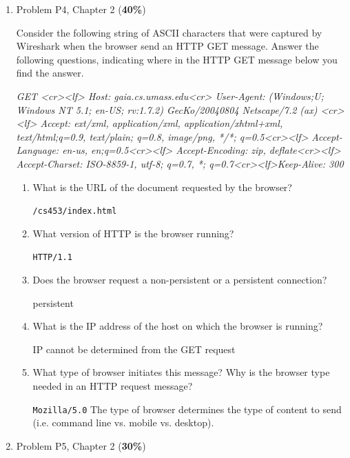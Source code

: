 \documentclass{article}
\begin{document}
\begin{enumerate}
\item Problem P4, Chapter 2 (\textbf{40\%})\par
Consider the following string of ASCII characters that were captured by Wireshark when the browser send an HTTP GET message. Answer the following questions, indicating where in the HTTP GET message below you find the answer.\par
{\textit{GET  <cr><lf> Host: gaia.cs.umass.edu<cr> User-Agent:  (Windows;U; Windows NT 5.1; en-US; rv:1.7.2) GecKo/20040804 Netscape/7.2 (ax) <cr><lf> Accept: ext/xml, application/xml, application/xhtml+xml, text/html;q=0.9, text/plain; q=0.8, image/png, */*; q=0.5<cr><lf> Accept-Language: en-us, en;q=0.5<cr><lf> Accept-Encoding: zip, deflate<cr><lf> Accept-Charset: ISO-8859-1, utf-8; q=0.7, *; q=0.7<cr><lf>Keep-Alive: 300 }}\par
\begin{enumerate}
  \item What is the URL of the document requested by the browser?\par
  \texttt{/cs453/index.html}\par
  \item What version of HTTP is the browser running?\par
  \texttt{HTTP/1.1}\par
  \item Does the browser request a non-persistent or a persistent connection?\par
  \textsf{persistent}\par
  \item What is the IP address of the host on which the browser is running?\par
  \textsf{IP cannot be determined from the GET request}\par
  \item What type of browser initiates this message? Why is the browser type needed in an HTTP request message?\par
  \texttt{Mozilla/5.0} \textsf{The type of browser determines the type of content to send (i.e. command line vs. mobile vs. desktop).}\par
\end{enumerate}
  \item Problem P5, Chapter 2 (\textbf{30\%})\par

\end{enumerate}
\end{document}
